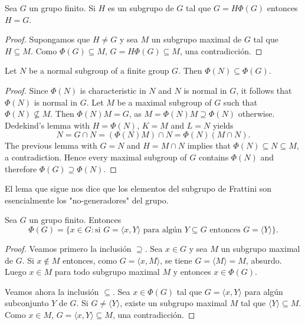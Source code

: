 \begin{lemma}
	\label{lemma:G=HPhi(G)}
	Sea $G$ un grupo finito. Si $H$ es un subgrupo de $G$ tal que $G=H\Phi(G)$
	entonces $H=G$.
\end{lemma}

\begin{proof}
	Supongamos que $H\ne G$ y sea $M$ un subgrupo maximal de $G$ tal que
	$H\subseteq M$. Como $\Phi(G)\subseteq M$, $G=H\Phi(G)\subseteq M$, una
	contradicción.
\end{proof}

\begin{proposition}
	\label{proposition:phi(N)phi(G)}
	Let $N$ be a normal subgroup of a finite group $G$. Then $\Phi(N)\subseteq\Phi(G)$.
\end{proposition}

\begin{proof}
	Since $\Phi(N)$ is characteristic in $N$ and $N$ is normal in $G$, it follows that 
	$\Phi(N)$
	is normal in $G$.  Let $M$ be a maximal subgroup of $G$ such that 
	$\Phi(N)\not\subseteq M$.  Then $\Phi(N)M=G$, as 
	$M=\Phi(N)M\supseteq\Phi(N)$ otherwise.  Dedekind's lemma with 
	$H=\Phi(N)$, $K=M$ and $L=N$ yields  
	\[
		N=G\cap N=(\Phi(N)M)\cap N=\Phi(N)(M\cap N).
	\]
	The previous lemma with $G=N$ and $H=M\cap N$ implies that $\Phi(N)\subseteq
	N\subseteq M$, a contradiction. Hence every maximal subgroup of $G$ 
	contains $\Phi(N)$ and therefore $\Phi(G)\supseteq\Phi(N)$. 
\end{proof}

El lema que sigue nos dice que los elementos del subgrupo de Frattini son esencialmente
los "no-generadores" del grupo. 

\begin{lemma}
	\label{lemma:nongenerators}
	Sea $G$ un grupo finito. Entonces 
	\[
	\Phi(G)=\{x\in G:\text{si $G=\langle x,Y\rangle$ para algún $Y\subseteq G$ entonces $G=\langle Y\rangle$}\}.
	\]
\end{lemma}

\begin{proof}
	Veamos primero la inclusión $\supseteq$.  Sea $x\in G$ y sea $M$ un
	subgrupo maximal de $G$.  Si $x\not\in M$ entonces, como $G=\langle
	x,M\rangle$, se tiene $G=\langle M\rangle=M$, absurdo. Luego $x\in M$ para
	todo subgrupo maximal $M$ y entonces $x\in \Phi(G)$. 

	Veamos ahora la inclusión $\subseteq$. Sea $x\in\Phi(G)$ tal que $G=\langle
	x,Y\rangle$ para algún subconjunto $Y$ de $G$. Si $G\ne \langle Y\rangle$,
	existe un subgrupo maximal $M$ tal que $\langle Y\rangle\subseteq M$. Como
	$x\in M$, $G=\langle x,Y\rangle\subseteq M$, una contradicción.
\end{proof}

